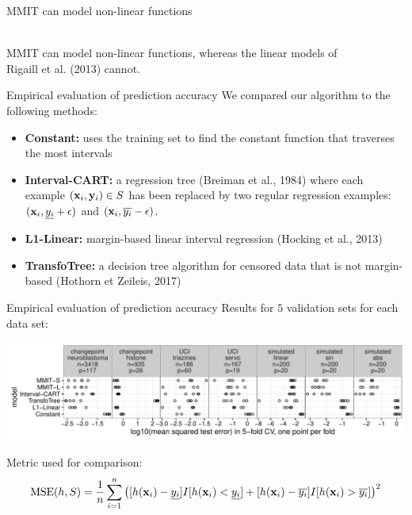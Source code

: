 \documentclass{beamer}
\newcommand{\ylower}[1]{\ensuremath{\underline{y_{#1}}}}
\newcommand{\yupper}[1]{\ensuremath{\overline{y_{#1}}}}
\begin{document}
\begin{frame}{MMIT can model non-linear functions}
	\begin{center}
		\resizebox{\textwidth}{!}{}\\[5mm]
	MMIT can model non-linear functions, whereas the linear models of\\Rigaill et al. (2013) cannot.
	\end{center}
\end{frame}

\begin{frame}{Empirical evaluation of prediction accuracy}
	We compared our algorithm to the following methods: \vspace{2mm}
	\begin{itemize}
		\item<+-> \textbf{Constant:} uses the training set to find the constant function that traverses the most intervals \vspace{2mm}
		\item<+-> \textbf{Interval-CART:} a regression tree (Breiman et al., 1984) where each example $(\mathbf{x}_i, \mathbf{y}_i) \in S$ has been replaced by two regular regression examples: $(\xb_i, \ylower{i} + \epsilon)$ and $(\xb_i, \yupper{i} - \epsilon)$.
		\vspace{2mm}
		\item<+-> \textbf{L1-Linear:} margin-based linear interval regression (Hocking et al., 2013)
		\vspace{2mm}
		\item<+-> \textbf{TransfoTree:} a decision tree algorithm for censored data that is not margin-based (Hothorn et Zeileis, 2017)
	\end{itemize}
\end{frame}

\begin{frame}{Empirical evaluation of prediction accuracy}
	Results for $5$ validation sets for each data set:
	\vspace{-3mm}
	\begin{center}
		\hspace*{-8.7mm}
		\includegraphics[width=1.1\textwidth]{figures/paper/figure-evaluate-predictions-folds.pdf}
	\end{center}
	
	\vspace{4mm}
	Metric used for comparison:
	\vspace{-2mm}
	\begin{equation*}
	\text{MSE}(h, S) = \frac{1}{n} \sum_{i=1}^n \left( [h(\xb_i) - \ylower{i}] I[h(\xb_i) < \ylower{i}] + [h(\xb_i) - \yupper{i}] I[h(\xb_i) > \yupper{i}] \right)^2
	\end{equation*}
\end{frame}
\end{document}
